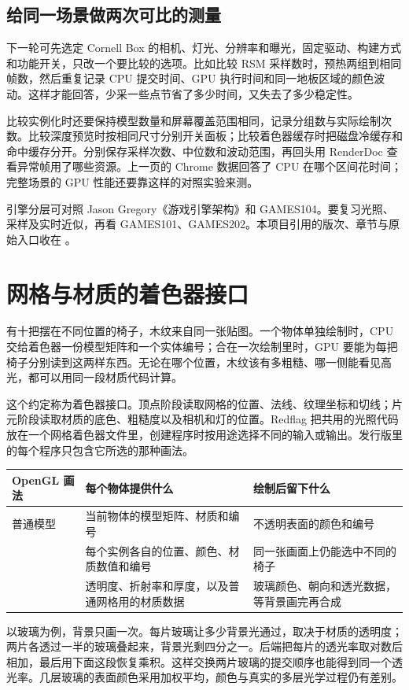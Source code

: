 \subsection{给同一场景做两次可比的测量}
下一轮可先选定 Cornell Box 的相机、灯光、分辨率和曝光，固定驱动、构建方式和功能开关，只改一个要比较的选项。比如比较 RSM 采样数时，预热两组到相同帧数，然后重复记录 CPU 提交时间、GPU 执行时间和同一地板区域的颜色波动。这样才能回答，少采一些点节省了多少时间，又失去了多少稳定性。

比较实例化时还要保持模型数量和屏幕覆盖范围相同，记录分组数与实际绘制次数。比较深度预览时按相同尺寸分别开关面板；比较着色器缓存时把磁盘冷缓存和命中缓存分开。分别保存采样次数、中位数和波动范围，再回头用 RenderDoc 查看异常帧用了哪些资源。上一页的 Chrome 数据回答了 CPU 在哪个区间花时间；完整场景的 GPU 性能还要靠这样的对照实验来测。

引擎分层可对照 Jason Gregory《游戏引擎架构》和 GAMES104。要复习光照、采样及实时近似，再看 GAMES101、GAMES202。本项目引用的版次、章节与原始入口收在 。
\clearpage
\section{网格与材质的着色器接口}
有十把摆在不同位置的椅子，木纹来自同一张贴图。一个物体单独绘制时，CPU 交给着色器一份模型矩阵和一个实体编号；合在一次绘制里时，GPU 要能为每把椅子分别读到这两样东西。无论在哪个位置，木纹该有多粗糙、哪一侧能看见高光，都可以用同一段材质代码计算。

这个约定称为着色器接口。顶点阶段读取网格的位置、法线、纹理坐标和切线；片元阶段读取材质的底色、粗糙度以及相机和灯的位置。Redflag 把共用的光照代码放在一个网格着色器文件里，创建程序时按用途选择不同的输入或输出。发行版里的每个程序只包含它所选的那种画法。

\noindent\begin{tabularx}{\textwidth}{L{3.15cm}YY}
\toprule
OpenGL 画法 & 每个物体提供什么 & 绘制后留下什么 \\\midrule
普通模型 & 当前物体的模型矩阵、材质和编号 & 不透明表面的颜色和编号 \\
 & 每个实例各自的位置、颜色、材质数值和编号 & 同一张画面上仍能选中不同的椅子 \\
 & 透明度、折射率和厚度，以及普通网格用的材质数据 & 玻璃颜色、朝向和透光数据，等背景画完再合成 \\\bottomrule
\end{tabularx}

以玻璃为例，背景只画一次。每片玻璃让多少背景光通过，取决于材质的透明度；两片各透过一半的玻璃叠起来，背景光剩四分之一。后端把每片的透光率取对数后相加，最后用下面这段恢复乘积。这样交换两片玻璃的提交顺序也能得到同一个透光率。几层玻璃的表面颜色采用加权平均，颜色与真实的多层光学过程仍有差别。

